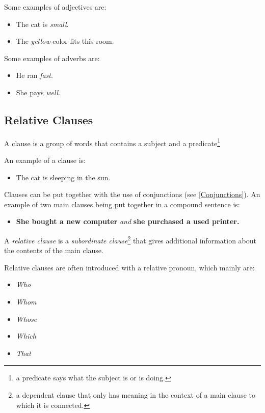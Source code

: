 Some examples of adjectives are:

\begin{itemize}
    \item The cat is \textit{small}.
    \item The \textit{yellow} color fits this room.
\end{itemize}

Some examples of adverbs are:

\begin{itemize}
    \item He ran \textit{fast}.
    \item She pays \textit{well}.
\end{itemize}

\newpage
\subsection{Relative Clauses}
\begin{definition}[Clauses]
    A clause is a group of words that contains a subject and a predicate\footnote{a predicate says what the subject is or is doing.}
\end{definition}
An example of a clause is:

\begin{itemize}
    \item The cat is sleeping in the sun.
\end{itemize}

Clauses can be put together with the use of conjunctions (see \ref{Conjunctions}). An example of two main clauses being put together in a compound sentence is:

\begin{itemize}
    \item \textbf{She bought a new computer} \textit{and} \textbf{she purchased a used printer.}
\end{itemize}

\begin{definition}
    A \textit{relative clause} is a \textit{subordinate clause}\footnote{a dependent clause that only has meaning in the context of a main clause to which it is connected.} that gives additional information about the contents of the main clause.
\end{definition}

Relative clauses are often introduced with a relative pronoun, which mainly are:

\begin{itemize}
    \item \textit{Who} 
    \item \textit{Whom} 
    \item \textit{Whose} 
    \item \textit{Which} 
    \item \textit{That} 
\end{itemize}

